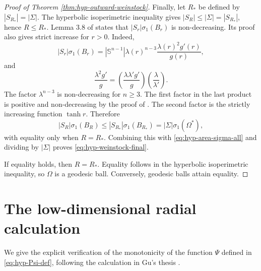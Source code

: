 \documentclass[11pt,reqno]{amsart}
\numberwithin{equation}{section}
\theoremstyle{definition}
\newtheorem{remark}[theorem]{Remark}
\newcommand{\Sn}{\mathbb S}
\begin{document}
\begin{proof}[Proof of Theorem \ref{thm:hyp-outward-weinstock}]
Finally, let $R_*$ be defined by $|S_{R_*}|=|\Sigma|$.  The hyperbolic isoperimetric inequality gives $|S_R|\leq|\Sigma|=|S_{R_*}|$, hence $R\leq R_*$.  Lemma 3.8 of \cite{GuLiWan2025} states that $|S_r|\sigma_1(B_r)$ is non-decreasing.  Its proof also gives strict increase for $r>0$.  Indeed,
\begin{equation*}
    |S_r|\sigma_1(B_r)
    =|\Sn^{n-1}|\lambda(r)^{n-3}
      \frac{\lambda(r)^2g'(r)}{g(r)},
\end{equation*}
and
\begin{equation*}
    \frac{\lambda^2g'}{g}
    =\left(\frac{\lambda\lambda'g'}{g}\right)
      \left(\frac{\lambda}{\lambda'}\right).
\end{equation*}
The factor $\lambda^{n-3}$ is non-decreasing for $n\geq3$.  The first factor in the last product is positive and non-decreasing by the proof of \cite[Lemma~3.6]{GuLiWan2025}. The second factor is the strictly increasing function $\tanh r$. Therefore
\begin{equation*}
    |S_R|\sigma_1(B_R)
    \leq
    |S_{R_*}|\sigma_1(B_{R_*})
    =|\Sigma|\sigma_1(\Omega^*),
\end{equation*}
with equality only when $R=R_*$.  Combining this with \eqref{eq:hyp-area-sigma-all} and dividing by $|\Sigma|$ proves \eqref{eq:hyp-weinstock-final}.

If equality holds, then $R=R_*$.  Equality follows in the hyperbolic isoperimetric inequality, so $\Omega$ is a geodesic ball.  Conversely, geodesic balls attain equality.
\end{proof}


\appendix
\section{The low-dimensional radial calculation}\label{app:low-dimensional-calculation}

We give the explicit verification of the monotonicity of the function $\Psi$ defined in \eqref{eq:hyp-Psi-def},  following the calculation in Gu's thesis \cite[Section~4.3.2]{GuThesis2026}.
\end{document}
